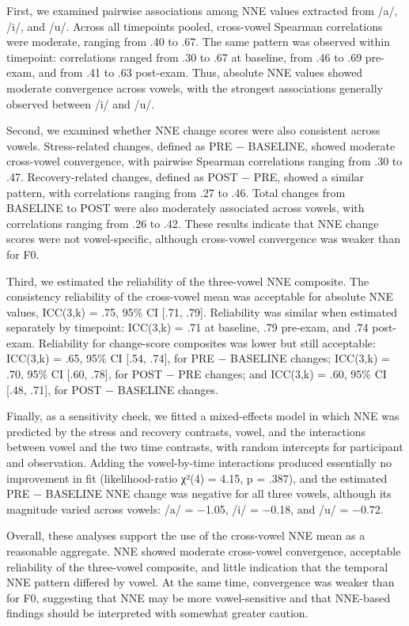 \documentclass[
  english,
  man,floatsintext]{apa6}
\begin{document}
First, we examined pairwise associations among NNE values extracted from /a/, /i/, and /u/. Across all timepoints pooled, cross-vowel Spearman correlations were moderate, ranging from .40 to .67. The same pattern was observed within timepoint: correlations ranged from .30 to .67 at baseline, from .46 to .69 pre-exam, and from .41 to .63 post-exam. Thus, absolute NNE values showed moderate convergence across vowels, with the strongest associations generally observed between /i/ and /u/.

Second, we examined whether NNE change scores were also consistent across vowels. Stress-related changes, defined as PRE − BASELINE, showed moderate cross-vowel convergence, with pairwise Spearman correlations ranging from .30 to .47. Recovery-related changes, defined as POST − PRE, showed a similar pattern, with correlations ranging from .27 to .46. Total changes from BASELINE to POST were also moderately associated across vowels, with correlations ranging from .26 to .42. These results indicate that NNE change scores were not vowel-specific, although cross-vowel convergence was weaker than for F0.

Third, we estimated the reliability of the three-vowel NNE composite. The consistency reliability of the cross-vowel mean was acceptable for absolute NNE values, ICC(3,k) = .75, 95\% CI {[}.71, .79{]}. Reliability was similar when estimated separately by timepoint: ICC(3,k) = .71 at baseline, .79 pre-exam, and .74 post-exam. Reliability for change-score composites was lower but still acceptable: ICC(3,k) = .65, 95\% CI {[}.54, .74{]}, for PRE − BASELINE changes; ICC(3,k) = .70, 95\% CI {[}.60, .78{]}, for POST − PRE changes; and ICC(3,k) = .60, 95\% CI {[}.48, .71{]}, for POST − BASELINE changes.

Finally, as a sensitivity check, we fitted a mixed-effects model in which NNE was predicted by the stress and recovery contrasts, vowel, and the interactions between vowel and the two time contrasts, with random intercepts for participant and observation. Adding the vowel-by-time interactions produced essentially no improvement in fit (likelihood-ratio χ²(4) = 4.15, p = .387), and the estimated PRE − BASELINE NNE change was negative for all three vowels, although its magnitude varied across vowels: /a/ = −1.05, /i/ = −0.18, and /u/ = −0.72.

Overall, these analyses support the use of the cross-vowel NNE mean as a reasonable aggregate. NNE showed moderate cross-vowel convergence, acceptable reliability of the three-vowel composite, and little indication that the temporal NNE pattern differed by vowel. At the same time, convergence was weaker than for F0, suggesting that NNE may be more vowel-sensitive and that NNE-based findings should be interpreted with somewhat greater caution.
\end{document}
